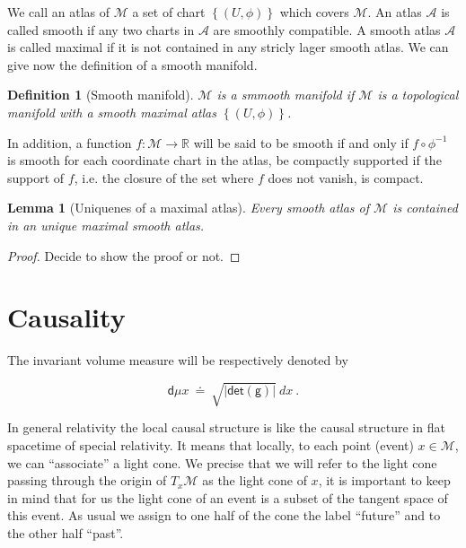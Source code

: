 \documentclass[10pt]{book}
\newcommand{\abs}[1]{\left|#1\right|}
\renewcommand{\det}{\mathsf{det}}
\newcommand{\Acal}{\mathcal{A}}
\newcommand{\Mcal}{\mathcal{M}}
\newcommand{\Rbb}{\mathbb{R}}
\newcommand{\dsf}{\mathsf{d}}
\newcommand{\gsf}{\mathsf{g}}
\theoremstyle{break}
\newtheorem{lemma}{Lemma}
\newtheorem{definition}{Definition}
\newtheorem{proof}{Proof}
\begin{document}
\bigskip


We call an atlas of $\Mcal$ a set of chart $\left\{ (U, \phi) \right\}$ which covers $\Mcal$. An atlas $\Acal$ is called smooth if any two charts in $\Acal$ are smoothly compatible. A smooth atlas $\Acal$ is called maximal if it is not contained in any stricly lager smooth atlas. We can give now the definition of a smooth manifold.

\begin{definition}[Smooth manifold]
$\Mcal$ is a smmooth manifold if $\Mcal$ is a topological manifold with a smooth maximal atlas $\left\{(U,\phi)\right\}$.
\end{definition}

In addition, a function $f : \Mcal \to \Rbb$ will be said to be smooth if and only if $f \circ \phi^{-1}$ is smooth for each coordinate chart in the atlas, be compactly supported if the support of $f$, i.e. the closure of the set where $f$ does not vanish, is compact.


\begin{lemma}[Uniquenes of a maximal atlas]
Every smooth atlas of $\Mcal$ is contained in an unique maximal smooth atlas.
\end{lemma}

\begin{proof}
Decide to show the proof or not.
\end{proof}


\section{Causality}




The invariant volume measure will be respectively denoted by  

\begin{equation*} 
 \dsf\mu x \ \doteq \ \sqrt{\abs{\det(\gsf)}} \ dx \ .
\end{equation*}



In general relativity the local causal structure is like the causal structure in flat spacetime of special relativity. It means that locally, to each point (event) $x\in\Mcal$, we can ``associate'' a light cone. We precise that we will refer to the light cone passing through the origin of $T_x\Mcal$ as the light cone of $x$, it is important to keep in mind that for us the light cone of an event is a subset of the tangent space of this event.
As usual we assign to one half of the cone the label ``future'' and to the other half ``past''. \par
\end{document}
